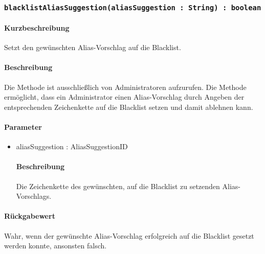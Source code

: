 \subsubsection{\texttt{blacklistAliasSuggestion(aliasSuggestion : String) : boolean}}%
\paragraph*{Kurzbeschreibung}
Setzt den gewünschten Alias-Vorschlag auf die Blacklist.
\paragraph*{Beschreibung}
Die Methode ist ausschließlich von Administratoren aufzurufen.
Die Methode ermöglicht, dass ein Administrator einen Alias-Vorschlag durch Angeben der entsprechenden Zeichenkette auf die Blacklist setzen und damit ablehnen kann.
\paragraph*{Parameter}
\begin{itemize}
	\item aliasSuggestion : AliasSuggestionID
		\paragraph*{Beschreibung}
		Die Zeichenkette des gewünschten, auf die Blacklist zu setzenden Alias-Vorschlags.
\end{itemize}
\paragraph*{Rückgabewert}
Wahr, wenn der gewünschte Alias-Vorschlag erfolgreich auf die Blacklist gesetzt werden konnte, ansonsten falsch.
